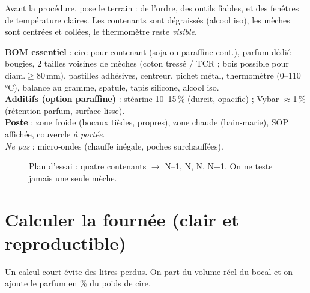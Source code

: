 \documentclass[../../main.tex]{subfiles}
\begin{document}
Avant la procédure, pose le terrain : de l’ordre, des outils fiables, et des fenêtres de température claires. Les contenants sont dégraissés (alcool iso), les mèches sont centrées et collées, le thermomètre reste \textit{visible}.

\begin{BlocMateriel}
\textbf{BOM essentiel} : cire pour contenant (soja ou paraffine cont.), parfum dédié bougies, 2 tailles voisines de mèches (coton tressé / TCR ; bois possible pour diam.\(\geq\)80\,mm), pastilles adhésives, centreur, pichet métal, thermomètre (0--110\,\si{\celsius}), balance au gramme, spatule, tapis silicone, alcool iso. \\
\textbf{Additifs (option paraffine)} : stéarine 10--15\,\% (durcit, opacifie) ; Vybar \(\approx\)1\,\% (rétention parfum, surface lisse). \\
\textbf{Poste} : zone froide (bocaux tièdes, propres), zone chaude (bain‑marie), SOP affichée, couvercle \textit{à portée}. \\
\textit{Ne pas} : micro‑ondes (chauffe inégale, poches surchauffées).
\end{BlocMateriel}

\begin{figure}[!h]
  \centering
  \caption{Plan d’essai : quatre contenants \(\rightarrow\) N--1, N, N, N+1. On ne teste jamais une seule mèche.}
\end{figure}

\section{Calculer la fournée (clair et reproductible)}

Un calcul court évite des litres perdus. On part du volume réel du bocal et on ajoute le parfum en \% du poids de cire.
\end{document}
